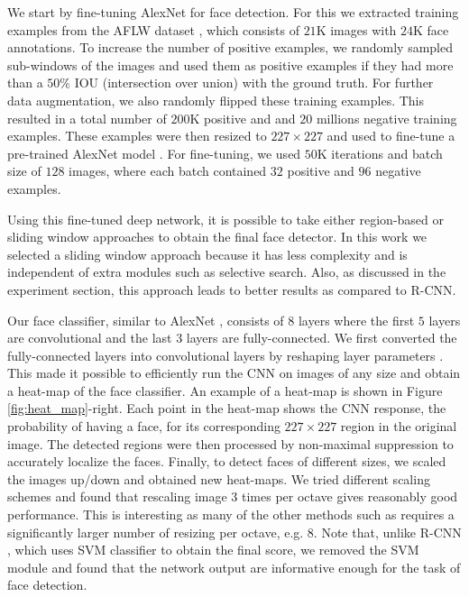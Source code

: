 \documentclass{sig-alternate-2013}
\begin{document}
We start by fine-tuning AlexNet \cite{alex-net} for face detection. For this  we extracted training examples from the AFLW dataset \cite{AFLW}, which consists of $21$K images with $24$K face annotations. To increase the number of positive examples, we randomly sampled sub-windows of the images and used them as positive examples if they had more than a $50\%$ IOU (intersection over union) with the ground truth. For further data augmentation, we also randomly flipped these training examples. This resulted in a total number of $200$K positive and and $20$ millions negative training examples. These examples were then resized to $227\times227$ and used to fine-tune a pre-trained AlexNet model \cite{alex-net}. 
For fine-tuning, we used $50$K iterations and batch size of $128$ images, where each batch contained $32$ positive and $96$ negative examples. 

Using this fine-tuned deep network, it is possible to take either region-based or sliding window approaches to obtain the final face detector. In this work we selected a sliding window approach because it has less complexity and is independent of extra modules such as selective search. Also, as discussed in the experiment section, this approach leads to better results as compared to R-CNN.


Our face classifier, similar to AlexNet \cite{alex-net}, consists of $8$ layers where the first $5$ layers are convolutional and the last $3$ layers are fully-connected. We first converted the fully-connected layers into convolutional layers by reshaping layer parameters \cite{densenet}. This made it possible to efficiently run the CNN on images of any size and obtain a heat-map of the face classifier. An example of a heat-map is shown in Figure \ref{fig:heat_map}-right. Each point in the heat-map shows the CNN response, the probability of having a face, for its corresponding $227 \times 227$ region in the original image. The detected regions were then processed by non-maximal suppression to accurately localize the faces. Finally, to detect faces of different sizes, we scaled the images up/down and obtained new heat-maps. We tried different scaling schemes and found that rescaling image $3$ times per octave gives reasonably good performance. This is interesting as many of the other methods such as \cite{head_hunter, pyramid_piotr} requires a significantly larger number of resizing per octave, e.g. $8$. Note that, unlike R-CNN \cite{rcnn}, which uses SVM classifier to obtain the final score, we removed the SVM module and found that the network output are informative enough for the task of face detection.
\end{document}

